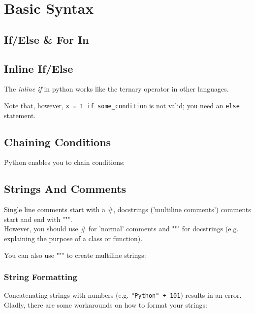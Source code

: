 \section{Basic Syntax}

  \subsection{If/Else \& For In}

  \subsection{Inline If/Else}
    The \textit{inline if} in python works like the ternary operator in other languages.
    
    Note that, however, \texttt{x = 1 if some_condition} is not valid; you need an \texttt{else} statement.

  \subsection{Chaining Conditions}
    Python enables you to chain conditions:
    

  \subsection{Strings And Comments}
    Single line comments start with a \#, docstrings ('multiline comments') comments start and end with """. \\
    However, you should use \# for 'normal' comments and """ for docstrings (e.g. explaining the purpose of a class or function).
    
    You can also use """ to create multiline strings:
    

    \subsubsection{String Formatting}
      Concatenating strings with numbers (e.g. \texttt{"Python" + 101}) results in an error. \\
      Gladly, there are some workarounds on how to format your strings:
    
